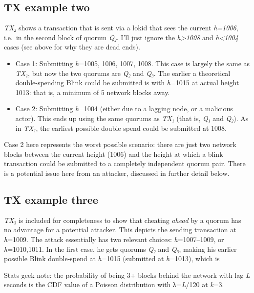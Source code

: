 \hypertarget{tx-example-two}{%
\subsection{TX example two}\label{tx-example-two}}

\emph{TX₂} shows a transaction that is sent via a lokid that sees the
current \emph{h=1006}, i.e.~in the second block of quorum \emph{Q₂}.
I'll just ignore the \emph{h\textgreater{}1008} and
\emph{h\textless{}1004} cases (see above for why they are dead ends).

\begin{itemize}
\item
  Case 1: Submitting \emph{h}=1005, 1006, 1007, 1008. This case is
  largely the same as \emph{TX₁}, but now the two quorums are \emph{Q₂}
  and \emph{Q₃}. The earlier a theoretical double-spending Blink could
  be submitted is with \emph{h}=1015 at actual height 1013: that is, a
  minimum of 5 network blocks away.
\item
  Case 2: Submitting \emph{h}=1004 (either due to a lagging node, or a
  malicious actor). This ends up using the same quorums as \emph{TX₁}
  (that is, \emph{Q₁} and \emph{Q₂}). As in \emph{TX₁}, the earliest
  possible double spend could be submitted at 1008.
\end{itemize}

Case 2 here represents the worst possible scenario: there are just two
network blocks between the current height (1006) and the height at which
a blink transaction could be submitted to a completely independent
quorum pair. There is a potential issue here from an attacker, discussed
in further detail below.

\hypertarget{tx-example-three}{%
\subsection{TX example three}\label{tx-example-three}}

\emph{TX₃} is included for completeness to show that cheating
\emph{ahead} by a quorum has no advantage for a potential attacker. This
depicts the sending transaction at \emph{h}=1009. The attack essentially
has two relevant choices: \emph{h}=1007--1009, or \emph{h}=1010,1011. In
the first case, he gets quorums \emph{Q₂} and \emph{Q₃}, making his
earlier possible Blink double-spend at \emph{h}=1015 (submitted at
\emph{h}=1013), which is

Stats geek note: the probability of being 3+ blocks behind the network
with lag \emph{L} seconds is the CDF value of a Poisson distribution
with λ=\emph{L}/120 at \emph{k}=3.

